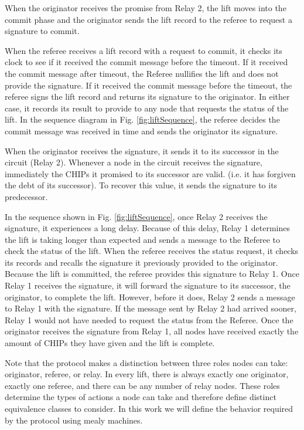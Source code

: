 \documentclass[article, onecolumn, 12pt]{IEEEtran}
\begin{document}
When the originator receives the promise from Relay 2, the lift moves into the commit phase and the originator sends the lift record to the referee to request a signature to commit. 

When the referee receives a lift record with a request to commit, it checks its clock to see if it received the commit message before the timeout. If it received the commit message after timeout, the Referee nullifies the lift and does not provide the signature. If it received the commit message before the timeout, the referee signs the lift record and returns its signature to the originator. In either case, it records its result to provide to any node that requests the status of the lift. In the sequence diagram in Fig. \ref{fig:liftSequence}, the referee decides the commit message was received in time and sends the originator its signature.

When the originator receives the signature, it sends it to its successor in the circuit (Relay 2). Whenever a node in the circuit receives the signature, immediately the CHIPs it promised to its successor are valid. (i.e. it has forgiven the debt of its successor). 
To recover this value, it sends the signature to its predecessor.

In the sequence shown in Fig. \ref{fig:liftSequence}, once Relay 2 receives the signature, it experiences a long delay. Because of this delay, Relay 1 determines the lift is taking longer than expected and sends a message to the Referee to check the status of the lift. When the referee receives the status request, it checks its records and recalls the signature it previously provided to the originator. Because the lift is committed, the referee provides this signature to Relay 1. Once Relay 1 receives the signature, it will forward the signature to its successor, the originator, to complete the lift. However, before it does, Relay 2 sends a message to Relay 1 with the signature. If the message sent by Relay 2 had arrived sooner, Relay 1 would not have needed to request the status from the Referee. Once the originator receives the signature from Relay 1, all nodes have received exactly the amount of CHIPs they have given and the lift is complete.

Note that the protocol makes a distinction between three roles nodes can take: originator, referee, or relay. In every lift, there is always exactly one originator, exactly one referee, and there can be any number of relay nodes. These roles determine the types of actions a node can take and therefore define distinct equivalence classes to consider. In this work we will define the behavior required by the protocol using mealy machines. 
\end{document}
